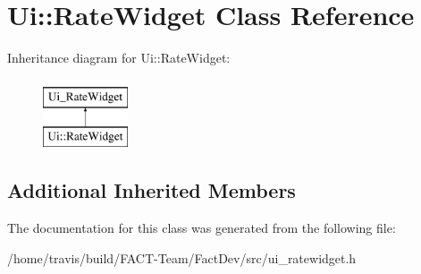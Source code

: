 \hypertarget{classUi_1_1RateWidget}{\section{Ui\-:\-:Rate\-Widget Class Reference}
\label{classUi_1_1RateWidget}
}
Inheritance diagram for Ui\-:\-:Rate\-Widget\-:\begin{figure}[H]
\begin{center}
\leavevmode
\includegraphics[height=2.000000cm]{df/d17/classUi_1_1RateWidget}
\end{center}
\end{figure}
\subsection*{Additional Inherited Members}


The documentation for this class was generated from the following file\-:\begin{DoxyCompactItemize}
\item 
/home/travis/build/\-F\-A\-C\-T-\/\-Team/\-Fact\-Dev/src/ui\-\_\-ratewidget.\-h\end{DoxyCompactItemize}
